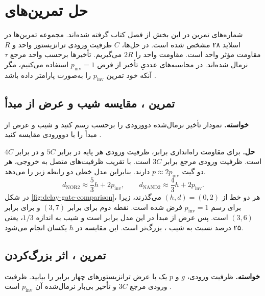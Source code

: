 \section{حل تمرین‌های }
\label{sec:delay-exercises}

شماره‌های تمرین در این بخش از فصل  کتاب گرفته شده‌اند.
مجموعه تمرین‌ها در اسلاید ۲۸ مشخص شده است. در حل‌ها، \(C\)
ظرفیت ورودی ترانزیستور واحد و \(R\) مقاومت مؤثر 
واحد است. مقاومت  واحد را \(2R\) می‌گیریم.
تأخیرها برحسب واحد مرجع \(\tau\) نرمال شده‌اند. در محاسبه‌های
عددیِ تأخیر  از فرض \(p_{\mathrm{inv}}=1\)
استفاده می‌کنیم، مگر آنکه خود تمرین \(p_{\mathrm{inv}}\) را
به‌صورت پارامتر داده باشد
\cite[تمرین‌های  تا ، صفحه ۱۷۷]{weste}
\cite[اسلاید ۲۸]{logicaleffortslides}.

\subsection{تمرین ، مقایسه شیب و عرض از مبدأ}
\label{sec:delay-exercise-nor-plot}

\textbf{خواسته.}
نمودار تأخیر نرمال‌شده  دوورودی را برحسب
 رسم کنید و شیب و عرض از مبدأ را
با  دوورودی مقایسه کنید
\cite[تمرین  و شکل ،
صفحات ۱۵۵ و ۱۷۷]{weste}.

\textbf{حل.}
برای مقاومت راه‌اندازی برابر، ظرفیت ورودی هر پایه در
 برابر \(5C\) و در  برابر \(4C\)
است. ظرفیت ورودی  مرجع برابر \(3C\) است.
با تقریب ظرفیت‌های  متصل به خروجی، هر دو
گیت \(p\approx2p_{\mathrm{inv}}\) دارند. بنابراین مدل خطی
دو رابطه زیر را می‌دهد.
\[
  d_{\mathrm{NOR2}}\approx\frac53 h+2p_{\mathrm{inv}},
  \qquad
  d_{\mathrm{NAND2}}\approx\frac43 h+2p_{\mathrm{inv}}.
\]
در شکل \ref{fig:delay-gate-comparison}، هر دو خط از
\((h,d)=(0,2)\) می‌گذرند، زیرا برای رسم
\(p_{\mathrm{inv}}=1\) فرض شده است. نقطه دوم برای
 برابر \((3,7)\) و برای  برابر
\((3,6)\) است. پس عرض از مبدأ در این مدل برابر است و
شیب  به اندازه \(1/3\)، یعنی ۲۵ درصد نسبت به
شیب ، بزرگ‌تر است. این مقایسه در \(h\) یکسان
انجام می‌شود.

\subsection{تمرین ، اثر بزرگ‌کردن }
\label{sec:delay-exercise-scaled-inverter}

\textbf{خواسته.}
ظرفیت ورودی، \(g\) و \(p\) یک  با عرض
ترانزیستورهای چهار برابر را بیابید. ظرفیت ورودی مرجع
\(3C\) و تأخیر بی‌بار نرمال‌شده آن \(p_{\mathrm{inv}}\) است
\cite[تمرین ، صفحه ۱۷۷]{weste}.

